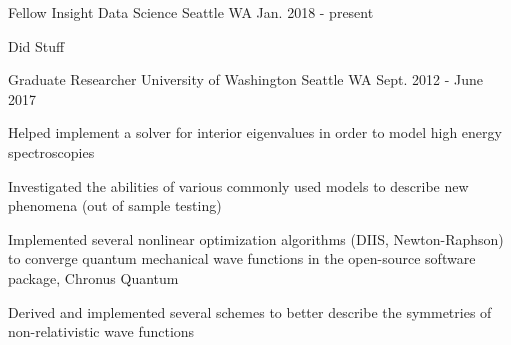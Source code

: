 


\begin{cventries}


\cventry
{Fellow} %
{Insight Data Science} %
{Seattle WA} %
{Jan. 2018 - present} %
{ %
\begin{cvitems}
\item {Did Stuff}
\end{cvitems}
}



\cventry
{Graduate Researcher} %
{University of Washington} %
{Seattle WA} %
{Sept. 2012 - June 2017} %
{ %
\begin{cvitems}
\item{Helped implement a solver for interior eigenvalues in order to model high energy spectroscopies}
\item{Investigated the abilities of various commonly used models to describe new phenomena (out of sample testing)}
\item{Implemented several nonlinear optimization algorithms (DIIS, Newton-Raphson) to converge quantum mechanical wave functions in the open-source software package, Chronus Quantum}
\item{Derived and implemented several schemes to better describe the symmetries of non-relativistic wave functions}
\end{cvitems}
}



\end{cventries}
